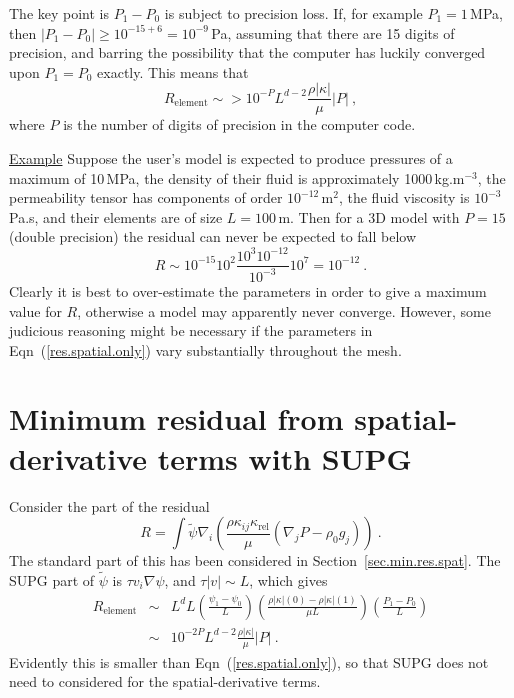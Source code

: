 \documentclass[]{scrreprt}
\begin{document}
The key point is $P_{1}-P_{0}$ is subject to precision loss.  If, for
example $P_{1}=1$\,MPa, then $|P_{1}-P_{0}|\geq 10^{-15+6} =
10^{-9}$\,Pa, assuming that there are 15 digits of precision, and
barring the possibility that the computer has luckily converged upon
$P_{1}=P_{0}$ exactly.  This means that
\begin{equation}
R_{\mathrm{element}} \sim> 10^{-P}L^{d-2}\frac{\rho|\kappa|}{\mu}|P|
\ ,
\label{res.spatial.only}
\end{equation}
where $P$ is the number of digits of precision in the computer code.

{\underline{Example}} Suppose the user's model is expected to produce
pressures of a maximum of 10\,MPa, the density of their fluid is
approximately 1000\,kg.m$^{-3}$, the permeability tensor has
components of order $10^{-12}$\,m$^{2}$, the fluid viscosity is
$10^{-3}$\,Pa.s, and their elements are of size $L=100$\,m.  Then for
a 3D model with $P=15$ (double precision) the residual can never be
expected to fall below
\begin{equation}
R \sim 10^{-15}10^{2}\frac{10^{3}10^{-12}}{10^{-3}}10^{7} = 10^{-12}
\ .
\end{equation}
Clearly it is best to over-estimate the parameters in order to give a
maximum value for $R$, otherwise a model may apparently never
converge.  However, some judicious reasoning might be necessary if the
parameters in Eqn~(\ref{res.spatial.only}) vary substantially
throughout the mesh.


\section{Minimum residual from spatial-derivative terms with SUPG}

Consider the part of the residual
\begin{equation}
R = \int \tilde{\psi} \nabla_{i}
\left( \frac{\rho \kappa_{ij}\kappa_{\mathrm{rel}}}{\mu} (\nabla_{j}P
- \rho_{0} g_{j}) \right) \ .
\end{equation}
The standard part of this has been considered in
Section~\ref{sec.min.res.spat}.  The SUPG part of $\tilde{\psi}$ is
$\tau v_{i}\nabla\psi$, and $\tau |v|\sim L$, which gives
\begin{eqnarray}
R_{\mathrm{element}} & \sim & L^{d} L \left(\frac{\psi_{1}-\psi_{0}}{L}\right)
\left( \frac{\rho|\kappa|(0) - \rho|\kappa|(1)}{\mu L}\right)
\left(\frac{P_{1}-P_{0}}{L}\right)
\nonumber \\
& \sim & 10^{-2P} L^{d-2} \frac{\rho|\kappa|}{\mu}|P|
\ .
\end{eqnarray}
Evidently this is smaller than Eqn~(\ref{res.spatial.only}), so that
SUPG does not need to considered for the spatial-derivative terms.
\end{document}
